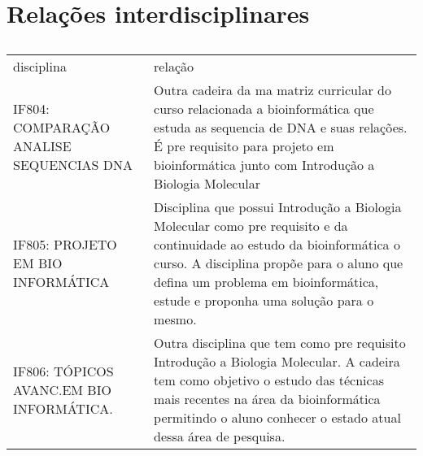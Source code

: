 \documentclass{article}
\begin{document}
 

\section{Relações interdisciplinares}
\begin{table}[h]
 \centering
 {\renewcommand\arraystretch{1.25}
 \begin{tabular}{ l l }
  \cline{1-1}\cline{2-2}  
    \multicolumn{1}{|p{4.083cm}|}{disciplina} &
    \multicolumn{1}{p{6.050cm}|}{relação}
  \\  
  \cline{1-1}\cline{2-2}  
    \multicolumn{1}{|p{4.083cm}|}{IF804: COMPARAÇÃO ANALISE SEQUENCIAS DNA \centering } &
    \multicolumn{1}{p{6.050cm}|}{Outra cadeira da ma matriz curricular do curso relacionada a bioinformática que estuda as sequencia de DNA e suas relações. É pre requisito para projeto em bioinformática junto com Introdução a Biologia Molecular}
  \\  
  \cline{1-1}\cline{2-2}  
    \multicolumn{1}{|p{4.083cm}|}{IF805: PROJETO EM BIO INFORMÁTICA \centering } &
    \multicolumn{1}{p{6.050cm}|}{Disciplina que possui Introdução a Biologia Molecular como pre requisito e da continuidade ao estudo da bioinformática o curso. A disciplina propõe para o aluno que defina um problema em bioinformática, estude e proponha uma solução para o mesmo.}
  \\  
  \cline{1-1}\cline{2-2}  
    \multicolumn{1}{|p{4.083cm}|}{IF806: TÓPICOS AVANC.EM BIO INFORMÁTICA. \centering } &
    \multicolumn{1}{p{6.050cm}|}{Outra disciplina que tem como pre requisito Introdução a Biologia Molecular. A cadeira tem como objetivo o estudo das técnicas mais recentes na área da bioinformática permitindo o aluno conhecer o estado atual dessa área de pesquisa.}
  \\  
  \hline
 
 \end{tabular} }
 \caption{\cite{PerfilCurricular}}
\end{table}




\end{document}
